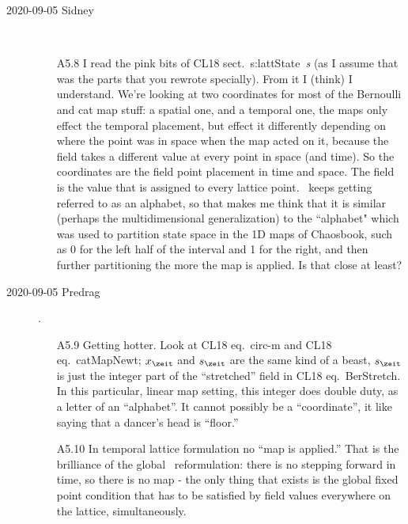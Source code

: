 \begin{description}
%

\item[2020-09-05 Sidney]~~
\begin{itemize}
	\item[A5.8]
I read the pink bits of CL18 sect.~{s:lattState}~{\em {\Lattstate}s} (as I
assume that was the parts that you rewrote specially). From it I (think)
I understand. We're looking at two coordinates for most of the Bernoulli
and cat map stuff: a spatial one, and a temporal one, the maps only
effect the temporal placement, but effect it differently depending on
where the point was in space when the map acted on it, because the field
takes a different value at every point in space (and time). So the
coordinates are the field point placement in time and space. The field is
the value that is assigned to every lattice point. \Mm\ keeps getting
referred to as an alphabet, so that makes me think that it is similar
(perhaps the multidimensional generalization) to the ``alphabet" which was
used to partition state space in the 1D maps of Chaosbook, such as 0 for
the left half of the interval and 1 for the right, and then further
partitioning the more the map is applied. Is that close at least?
\end{itemize}

\item[2020-09-05 Predrag].
\begin{itemize}
	\item[A5.9]
Getting hotter. Look at CL18 eq.~{circ-m} and CL18 eq.~{catMapNewt};
$\ssp_{\zeit}$ and $\Ssym{\zeit}$ are the same kind of a beast,
$\Ssym{\zeit}$ is just the integer part of the ``stretched'' field in
CL18 eq.~{BerStretch}. In this particular, linear map setting, this integer
does double duty, as a letter of an ``alphabet''. It cannot possibly be a
``coordinate'', it like saying that a dancer's head is ``floor.''
	\item[A5.10]
In temporal lattice formulation no ``map is applied.'' That is the
brilliance of the global \spt\ reformulation: there is no stepping
forward in time, so there is no map - the only thing that exists is the
global fixed point condition that has to be satisfied by field values
everywhere on the lattice, simultaneously.


\end{itemize}
\end{description}
